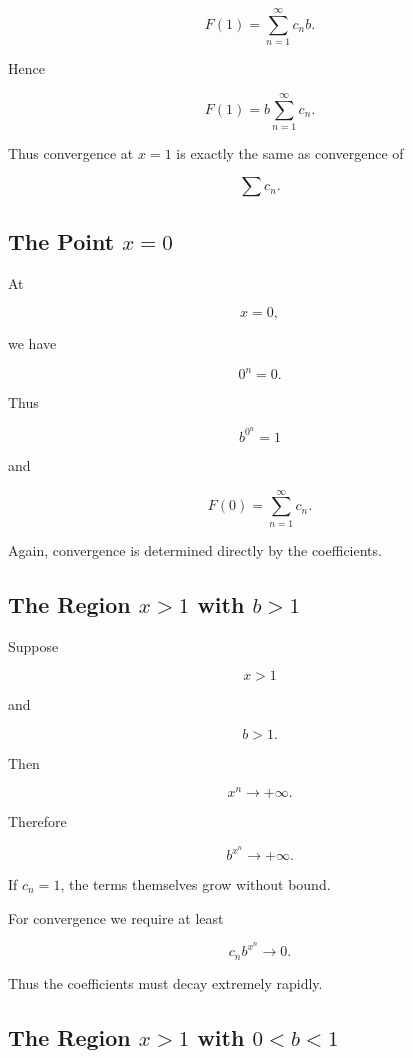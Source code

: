 \[
F(1)
=
\sum_{n=1}^{\infty}c_nb.
\]

Hence

\[
\boxed{
F(1)=b\sum_{n=1}^{\infty}c_n.
}
\]

Thus convergence at \(x=1\) is exactly the same as convergence of

\[
\sum c_n.
\]

\subsection{The Point \texorpdfstring{$x=0$}{x=0}}

At

\[
x=0,
\]

we have

\[
0^n=0.
\]

Thus

\[
b^{0^n}=1
\]

and

\[
\boxed{
F(0)
=
\sum_{n=1}^{\infty}c_n.
}
\]

Again, convergence is determined directly by the coefficients.

\subsection{The Region \texorpdfstring{$x>1$}{x>1} with \texorpdfstring{$b>1$}{b>1}}

Suppose

\[
x>1
\]

and

\[
b>1.
\]

Then

\[
x^n\longrightarrow+\infty.
\]

Therefore

\[
b^{x^n}\longrightarrow+\infty.
\]

If \(c_n=1\), the terms themselves grow without bound.

For convergence we require at least

\[
\boxed{
c_nb^{x^n}\longrightarrow0.
}
\]

Thus the coefficients must decay extremely rapidly.

\subsection{The Region \texorpdfstring{$x>1$}{x>1} with \texorpdfstring{$0<b<1$}{0<b<1}}


